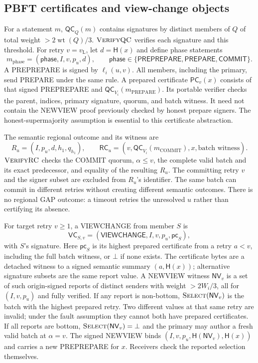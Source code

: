 \documentclass[11pt,a4paper,onecolumn]{article}
\newcommand{\Hash}{\mathsf H}
\newcommand{\QC}{\mathsf{QC}}
\newcommand{\RC}{\mathsf{RC}}
\newcommand{\lv}{v_{\mathrm L}}
\newcommand{\PC}{\mathsf{PC}}
\newcommand{\NV}{\mathsf{NV}}
\newcommand{\botv}{\bot}
\newcommand{\wt}{\operatorname{wt}}
\newcommand{\Tag}[1]{\mathsf{#1}}
\newcommand{\Proc}[1]{\textnormal{\textsc{#1}}}
\theoremstyle{remark}\newtheorem{example}[definition]{Example}
\begin{document}
\subsection{PBFT certificates and view-change objects}\label{sec:pbftobjects}
For a statement $m$, $\QC_Q(m)$ contains signatures by distinct members of $Q$
of total weight $>2\wt(Q)/3$. $\Proc{VerifyQC}$ verifies each signature and this
threshold. For retry $v=\lv$, let $d=\Hash(x)$ and define phase statements
\[
 m_{\mathrm{phase}}=(\Tag{phase},I,v,p_u,d),\qquad
 \mathsf{phase}\in\{\mathsf{PREPREPARE},\mathsf{PREPARE},\mathsf{COMMIT}\}.
\]
A PREPREPARE is signed by $\ell_i(u,v)$. All members, including the primary,
send PREPARE under the same rule. A prepared certificate $\PC_v(x)$ consists
of that signed PREPREPARE and $\QC_{V_i}(m_{\mathrm{PREPARE}})$.
Its portable verifier checks the parent, indices, primary signature, quorum,
and batch witness. It need not contain the NEWVIEW proof previously checked
by honest prepare signers. The honest-supermajority assumption is essential
to this certificate abstraction.

The semantic regional outcome and its witness are
\begin{equation}\label{eq:rc}
 R_u=(I,p_u,d,h_1,q_{h_1}),\qquad
 \RC_u=(v,\QC_{V_i}(m_{\mathrm{COMMIT}}),x,\text{batch witness}).
\end{equation}
$\Proc{VerifyRC}$ checks the COMMIT quorum, $\alpha\leq v$, the complete valid
batch and its exact predecessor, and equality of the resulting $R_u$.
The committing retry $v$ and the signer subset are excluded from $R_u$'s
identifier. The same batch can commit in different retries without creating
different semantic outcomes. There is no regional GAP outcome: a timeout
retries the unresolved $u$ rather than certifying its absence.

For target retry $v\geq1$, a VIEWCHANGE from member $S$ is
\[
 \mathsf{VC}_{S,v}=(\Tag{VIEWCHANGE},I,v,p_u,\mathsf{pc}_S),
\]
with $S$'s signature. Here $\mathsf{pc}_S$ is its highest prepared certificate
from a retry $a<v$, including the full batch witness, or $\botv$ if none exists.
The certificate bytes are a detached witness to a signed semantic summary
$(a,\Hash(x))$; alternative signature subsets are the same report value.
A NEWVIEW witness $\NV_v$ is a set of such origin-signed reports of distinct
senders with weight $>2W_i/3$, all for $(I,v,p_u)$ and fully verified.
If any report is non-bottom, $\Proc{Select}(\NV_v)$ is the batch with the
highest prepared retry. Two different values at that same retry are invalid;
under the fault assumption they cannot both have prepared certificates.
If all reports are bottom, $\Proc{Select}(\NV_v)=\botv$ and the primary may
author a fresh valid batch at $\alpha=v$.
The signed NEWVIEW binds $(I,v,p_u,\Hash(\NV_v),\Hash(x))$ and carries a new
PREPREPARE for $x$. Receivers check the reported selection themselves.
\end{document}
